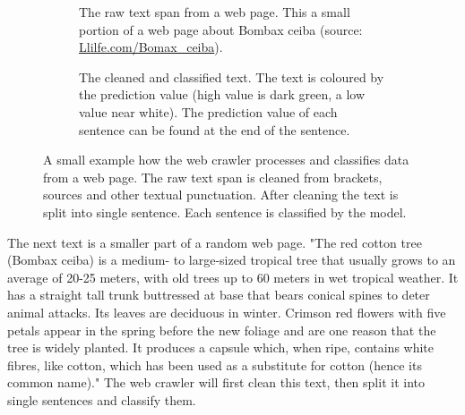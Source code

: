 \documentclass[a4paper, 12pt, oneside]{book} %
\begin{document}
\begin{figure} [h]
     \centering
     \begin{subfigure}[b]{1.00\textwidth}
         \centering
         \caption{The raw text span from a web page. This a small portion of a web page about Bombax ceiba (source: \href{http://www.llifle.com/Encyclopedia/TREES/Family/Bombacaceae/31994/Bombax_ceiba}{Llilfe.com/Bomax\_ceiba}).}
         \label{fig:webcrawler_sents_nopred}
     \end{subfigure}
     \vfill
     \begin{subfigure}[b]{1.00\textwidth}
         \centering
         \caption{The cleaned and classified text. The text is coloured by the prediction value (high value is dark green, a low value near white). The prediction value of each sentence can be found at the end of the sentence.}
         \label{fig:webcrawler_sents_pred}
     \end{subfigure}
     \caption{A small example how the web crawler processes and classifies data from a web page. The raw text span is cleaned from brackets, sources and other textual punctuation. After cleaning the text is split into single sentence. Each sentence is classified by the model.}
\end{figure}

The next text is a smaller part of a random web page.
"The red cotton tree (Bombax ceiba) is a medium- to large-sized tropical tree that usually grows to an average of 20-25 meters, with old trees up to 60 meters in wet tropical weather. It has a straight tall trunk buttressed at base that bears conical spines to deter animal attacks. Its leaves are deciduous in winter. Crimson red flowers with five petals appear in the spring before the new foliage and are one reason that the tree is widely planted. It produces a capsule which, when ripe, contains white fibres, like cotton, which has been used as a substitute for cotton (hence its common name)."
The web crawler will first clean this text, then split it into single sentences and classify them.
\end{document}
